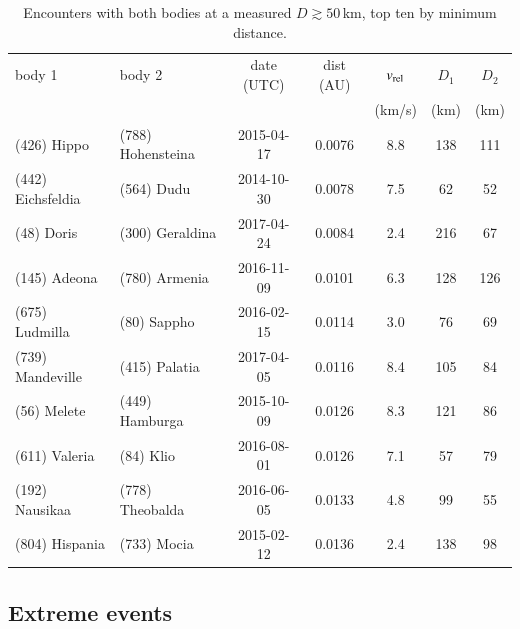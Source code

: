 \documentclass{aa}
\begin{document}
\begin{table}
\caption{Encounters with both bodies at a measured $D\gtrsim50$\,km, top ten by
minimum distance.}
\label{tab:dd50}
\centering
\small
\begin{tabular}{llccccc}
\hline\hline
body 1 & body 2 & date (UTC) & dist (AU) & $v_{\rm rel}$ & $D_1$ & $D_2$ \\
       &        &            &           & (km/s)        & (km)  & (km)  \\
\hline
(426) Hippo       & (788) Hohensteina & 2015-04-17 & 0.0076 & 8.8 & 138 & 111 \\
(442) Eichsfeldia & (564) Dudu        & 2014-10-30 & 0.0078 & 7.5 & 62  & 52  \\
(48) Doris        & (300) Geraldina   & 2017-04-24 & 0.0084 & 2.4 & 216 & 67  \\
(145) Adeona      & (780) Armenia     & 2016-11-09 & 0.0101 & 6.3 & 128 & 126 \\
(675) Ludmilla    & (80) Sappho       & 2016-02-15 & 0.0114 & 3.0 & 76  & 69  \\
(739) Mandeville  & (415) Palatia     & 2017-04-05 & 0.0116 & 8.4 & 105 & 84  \\
(56) Melete       & (449) Hamburga    & 2015-10-09 & 0.0126 & 8.3 & 121 & 86  \\
(611) Valeria     & (84) Klio         & 2016-08-01 & 0.0126 & 7.1 & 57  & 79  \\
(192) Nausikaa    & (778) Theobalda   & 2016-06-05 & 0.0133 & 4.8 & 99  & 55  \\
(804) Hispania    & (733) Mocia       & 2015-02-12 & 0.0136 & 2.4 & 138 & 98  \\
\hline
\end{tabular}
\end{table}

\subsection{Extreme events}
\label{sec:extreme}
\end{document}
